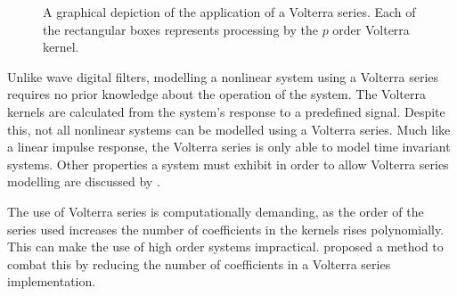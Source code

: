 			\begin{figure}[h!]
				\centering
				\caption{A graphical depiction of the application of a Volterra series. Each of the
					rectangular boxes represents processing by the $p$ order Volterra
					kernel.}
				\label{fig:VolterraModel}
			\end{figure}

			Unlike wave digital filters, modelling a nonlinear system using a Volterra series requires no prior
			knowledge about the operation of the system. The Volterra kernels are calculated from the system's
			response to a predefined signal. Despite this, not all nonlinear systems can be modelled using a
			Volterra series. Much like a linear impulse response, the Volterra series is only able to model
			time invariant systems. Other properties a system must exhibit in order to allow Volterra series
			modelling are discussed by \citet{billings2013nonlinear}.

			The use of Volterra series is computationally demanding, as the order of the series used increases
			the number of coefficients in the kernels rises polynomially. This can make the use of high order
			systems impractical. \citet{reed1996practical} proposed a method to combat this by reducing the
			number of coefficients in a Volterra series implementation.

